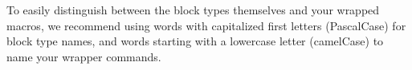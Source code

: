 
To easily distinguish between the block types themselves and your wrapped macros, we recommend using words with capitalized first letters (PascalCase) for block type names, and words starting with a lowercase letter (camelCase) to name your wrapper commands.

\newpage
